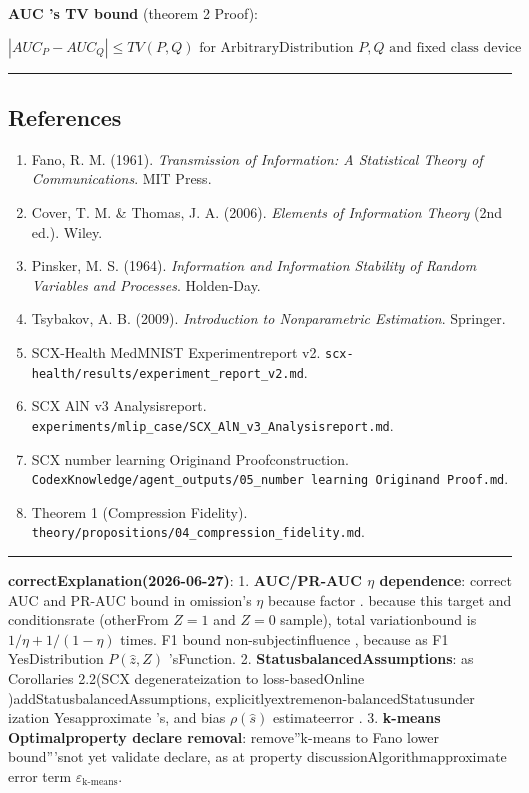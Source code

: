 \documentclass[
  12pt,
]{article}
\providecommand{\tightlist}{%
  \setlength{\itemsep}{0pt}\setlength{\parskip}{0pt}}
\begin{document}
\textbf{AUC 's TV bound }(theorem  2 Proof):

\[|AUC_P - AUC_Q| \leq TV(P, Q) \text{ for ArbitraryDistribution } P, Q \text{ and fixed class device }\]

\begin{center}\rule{0.5\linewidth}{0.5pt}\end{center}

\subsection{References}\label{ux53c2ux8003ux6587ux732e}

\begin{enumerate}
\def\labelenumi{\arabic{enumi}.}
\tightlist
\item
  Fano, R. M. (1961). \emph{Transmission of Information: A Statistical
  Theory of Communications}. MIT Press.
\item
  Cover, T. M. \& Thomas, J. A. (2006). \emph{Elements of Information
  Theory} (2nd ed.). Wiley.
\item
  Pinsker, M. S. (1964). \emph{Information and Information Stability of
  Random Variables and Processes}. Holden-Day.
\item
  Tsybakov, A. B. (2009). \emph{Introduction to Nonparametric
  Estimation}. Springer.
\item
  SCX-Health MedMNIST Experimentreport v2.
  \texttt{scx-health/results/experiment\_report\_v2.md}.
\item
  SCX AlN v3 Analysisreport.
  \texttt{experiments/mlip\_case/SCX\_AlN\_v3\_Analysisreport.md}.
\item
  SCX number learning Originand Proofconstruction.
  \texttt{CodexKnowledge/agent\_outputs/05\_number learning Originand Proof.md}.
\item
  Theorem 1 (Compression Fidelity).
  \texttt{theory/propositions/04\_compression\_fidelity.md}.
\end{enumerate}

\begin{center}\rule{0.5\linewidth}{0.5pt}\end{center}

\textbf{correctExplanation(2026-06-27)}:  1. \textbf{AUC/PR-AUC \(\eta\)
dependence}: correct AUC and  PR-AUC bound in omission's \(\eta\)
because factor . because this target and conditionsrate (otherFrom \(Z=1\) and  \(Z=0\)
sample), total variationbound is  \(1/\eta + 1/(1-\eta)\) times. F1 bound non-subjectinfluence , because as 
F1 YesDistribution \(P(\hat{z}, Z)\) 'sFunction.  2.
\textbf{StatusbalancedAssumptions}: as Corollaries 2.2(SCX
degenerateization to loss-basedOnline )addStatusbalancedAssumptions, explicitlyextremenon-balancedStatusunder ization Yesapproximate 's, and bias 
\(\rho(\hat{s})\) estimateerror .  3. \textbf{k-means
Optimalproperty declare removal}: remove''k-means to  Fano
lower bound'''snot yet validate declare, as at property discussionAlgorithmapproximate error term
\(\varepsilon_{\text{k-means}}\). 
\end{document}
